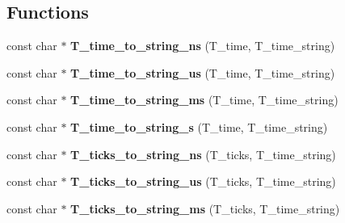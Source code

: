 \subsection*{Functions}
\begin{DoxyCompactItemize}
\item 
\mbox{\label{group__RTEMSTestFrameworkTime_ga9aee4bb1fe6aa29a674dab6bd538064d}} 
const char $\ast$ {\bfseries T\+\_\+time\+\_\+to\+\_\+string\+\_\+ns} (T\+\_\+time, T\+\_\+time\+\_\+string)
\item 
\mbox{\label{group__RTEMSTestFrameworkTime_gae7eae834b8604e2833240629a8536956}} 
const char $\ast$ {\bfseries T\+\_\+time\+\_\+to\+\_\+string\+\_\+us} (T\+\_\+time, T\+\_\+time\+\_\+string)
\item 
\mbox{\label{group__RTEMSTestFrameworkTime_ga240537a503683aba44f51ffab60f4e7b}} 
const char $\ast$ {\bfseries T\+\_\+time\+\_\+to\+\_\+string\+\_\+ms} (T\+\_\+time, T\+\_\+time\+\_\+string)
\item 
\mbox{\label{group__RTEMSTestFrameworkTime_ga3949c061f2f24a268570e4a836eb7931}} 
const char $\ast$ {\bfseries T\+\_\+time\+\_\+to\+\_\+string\+\_\+s} (T\+\_\+time, T\+\_\+time\+\_\+string)
\item 
\mbox{\label{group__RTEMSTestFrameworkTime_ga91daefe28a3cf70cbc6d78fd27eb4325}} 
const char $\ast$ {\bfseries T\+\_\+ticks\+\_\+to\+\_\+string\+\_\+ns} (T\+\_\+ticks, T\+\_\+time\+\_\+string)
\item 
\mbox{\label{group__RTEMSTestFrameworkTime_ga21e64e8500cccc63b16c585f1a2c27ee}} 
const char $\ast$ {\bfseries T\+\_\+ticks\+\_\+to\+\_\+string\+\_\+us} (T\+\_\+ticks, T\+\_\+time\+\_\+string)
\item 
\mbox{\label{group__RTEMSTestFrameworkTime_gae85338fc69fdd4dd7ef377e29fd279f8}} 
const char $\ast$ {\bfseries T\+\_\+ticks\+\_\+to\+\_\+string\+\_\+ms} (T\+\_\+ticks, T\+\_\+time\+\_\+string)
\item 
\mbox{\label{group__RTEMSTestFrameworkTime_gaf1cce065c1f8e648de8046bbb0c84c54}} 

\end{DoxyCompactItemize}
